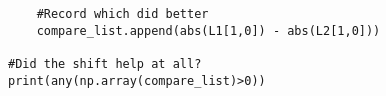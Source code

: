 \documentclass[10pt,a4paper]{article}
\begin{document}
\begin{verbatim}
    #Record which did better                                                                                                                                                               
    compare_list.append(abs(L1[1,0]) - abs(L2[1,0]))                                                                                                                                       
                                                                                                                                                                                           
#Did the shift help at all?                                                                                                                                                                
print(any(np.array(compare_list)>0))  
\end{verbatim}
\end{document}
